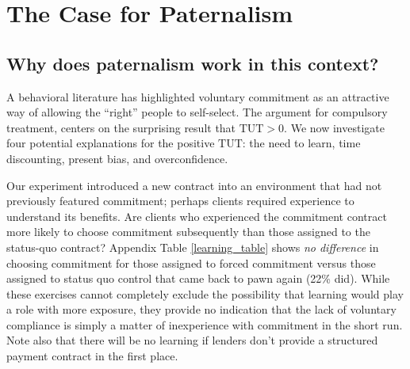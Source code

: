 \documentclass[12pt, a4paper]{article}
\begin{document}
\section{The Case for Paternalism}
\label{Paternalism}

\subsection{Why does paternalism work in this context?}
\label{why_paternalism}

A behavioral literature has highlighted voluntary commitment as an attractive way of allowing the ``right'' people to self-select. %
The argument for compulsory treatment, centers on the surprising result that $\text{TUT}>0$. We now investigate four potential explanations for the positive $\text{TUT}$: the need to learn, time discounting, present bias, and overconfidence.
   


Our experiment introduced a new contract into an environment that had not previously featured commitment; perhaps clients required experience to understand its benefits. Are clients who experienced the commitment contract more likely to choose commitment subsequently than those assigned to the status-quo contract? %
Appendix Table \ref{learning_table} %
shows \textit{no difference} in choosing commitment for those assigned to forced commitment versus those assigned to status quo control that came back to pawn again (22\% did). %
While these exercises cannot completely exclude the possibility that learning would play a role with more exposure, they provide no indication that the lack of voluntary compliance is simply a matter of inexperience with commitment in the short run. Note also that there will be no learning if lenders don't provide a structured payment contract in the first place.
\end{document}
